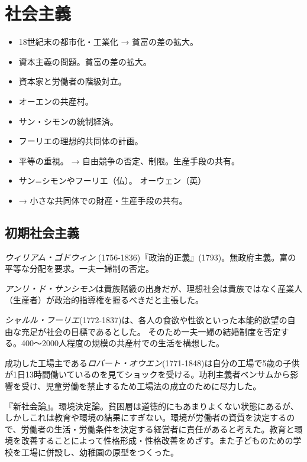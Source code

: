 \documentclass[uplatex,dvipdfmx]{jsarticle} \usepackage{mystyle}%
\title{}
\begin{document}
\maketitle
\else\chapter{社会主義}\fi


\begin{itemize}

\item 18世紀末の都市化・工業化 → 貧富の差の拡大。
\item 資本主義の問題。貧富の差の拡大。
\item 資本家と労働者の階級対立。
\item オーエンの共産村。
\item サン・シモンの統制経済。
\item フーリエの理想的共同体の計画。
\item 平等の重視。 → 自由競争の否定、制限。生産手段の共有。
\item サン=シモンやフーリエ（仏）。 オーウェン（英）
\item → 小さな共同体での財産・生産手段の共有。

\end{itemize}


\section{初期社会主義}



\emph{ウィリアム・ゴドウィン} (1756-1836)『政治的正義』(1793)。無政府主義。富の平等な分配を要求。一夫一婦制の否定。


\emph{アンリ・ド・サンシモン}は貴族階級の出身だが、理想社会は貴族ではなく産業人（生産者）が政治的指導権を握るべきだと主張した。


\emph{シャルル・フーリエ}(1772-1837)は、各人の食欲や性欲といった本能的欲望の自由な充足が社会の目標であるとした。
そのため一夫一婦の結婚制度を否定する。400〜2000人程度の規模の共産村での生活を構想した。

成功した工場主である\emph{ロバート・オウエン}(1771-1848)は自分の工場で5歳の子供が1日13時間働いているのを見てショックを受ける。功利主義者ベンサムから影響を受け、児童労働を禁止するため工場法の成立のために尽力した。


『新社会論』。環境決定論。貧困層は道徳的にもあまりよくない状態にあるが、しかしこれは教育や環境の結果にすぎない。環境が労働者の資質を決定するので、労働者の生活・労働条件を決定する経営者に責任があると考えた。教育と環境を改善することによって性格形成・性格改善をめざす。また子どものための学校を工場に併設し、幼稚園の原型をつくった。
\end{document}
